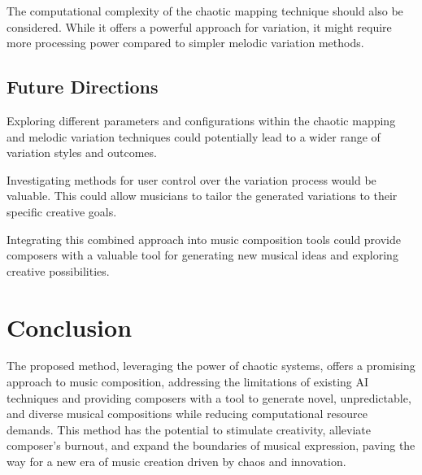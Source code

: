\documentclass[11pt]{article}
\begin{document}
The computational complexity of the chaotic mapping technique should also be considered. While it offers a powerful approach for variation, it might require more processing power compared to simpler melodic variation methods.

\subsection{Future Directions}

Exploring different parameters and configurations within the chaotic mapping and melodic variation techniques could potentially lead to a wider range of variation styles and outcomes.

Investigating methods for user control over the variation process would be valuable. This could allow musicians to tailor the generated variations to their specific creative goals.

Integrating this combined approach into music composition tools could provide composers with a valuable tool for generating new musical ideas and exploring creative possibilities.

\section{Conclusion}

The proposed method, leveraging the power of chaotic systems, offers a promising approach to music composition, addressing the limitations of existing AI techniques and providing composers with a tool to generate novel, unpredictable, and diverse musical compositions while reducing computational resource demands. This method has the potential to stimulate creativity, alleviate composer's burnout, and expand the boundaries of musical expression, paving the way for a new era of music creation driven by chaos and innovation.
\end{document}
